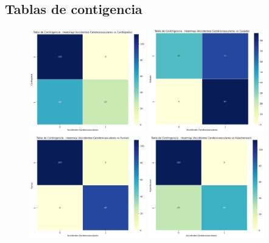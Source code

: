 \documentclass[a4paper, 12pt]{article}
\begin{document}
\subsection{Tablas de contigencia}

\begin{figure}[H]
    \centering
    \includegraphics[width=0.45\textwidth]{img/Heatmap/Accidentes_Cardiopatia.png} \hspace{0.5cm}
    \includegraphics[width=0.45\textwidth]{img/Heatmap/Accidentes_Casado.png} \vspace{0.5cm}
    \vspace{0.3cm}
    \includegraphics[width=0.45\textwidth]{img/Heatmap/Accidentes_Fumar.png} \hspace{0.5cm}
    \includegraphics[width=0.45\textwidth]{img/Heatmap/Accidentes_Hipertension.png}
\end{figure}
\end{document}
